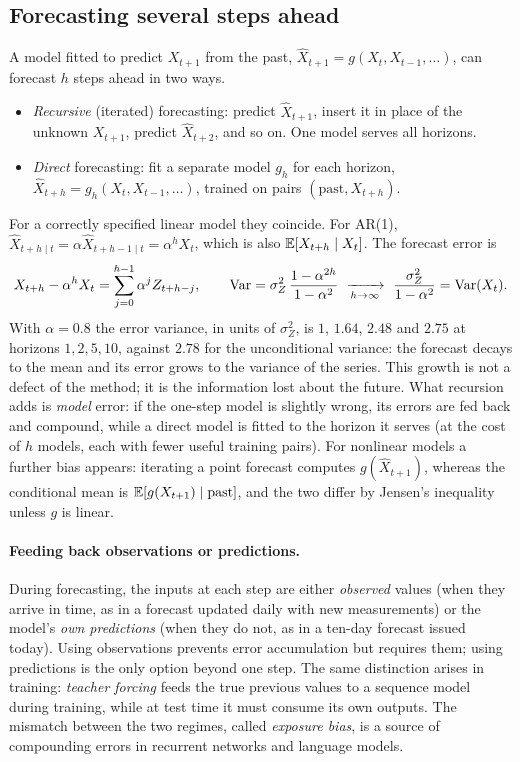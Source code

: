 \begin{notechapter}
\section{Forecasting several steps ahead}\label{decomposition-forecasting:sec:multistep}

A model fitted to predict $X_{t+1}$ from the past, $\hat X_{t+1} = g(X_t, X_{t-1},\dots)$, can forecast $h$ steps ahead
in two ways.
\begin{itemize}[nosep]
  \item \emph{Recursive} (iterated) forecasting: predict $\hat X_{t+1}$, insert it in place of the unknown
        $X_{t+1}$, predict $\hat X_{t+2}$, and so on. One model serves all horizons.
  \item \emph{Direct} forecasting: fit a separate model $g_h$ for each horizon, $\hat X_{t+h} = g_h(X_t, X_{t-1},\dots)$,
        trained on pairs $(\text{past}, X_{t+h})$.
\end{itemize}
For a correctly specified linear model they coincide. For AR(1),
$\hat X_{t+h\mid t} = \alpha\hat X_{t+h-1\mid t} = \alpha^hX_t$, which is also $\mathbb{E}[X_{t+h}\mid X_t]$. The forecast error is
\[
  X_{t+h} - \alpha^hX_t = \sum_{j=0}^{h-1}\alpha^jZ_{t+h-j},\qquad
  \Var = \sigma_Z^2\,\frac{1 - \alpha^{2h}}{1 - \alpha^2}\ \xrightarrow[h\to\infty]{}\ \frac{\sigma_Z^2}{1 - \alpha^2} = \Var(X_t).
\]
With $\alpha = 0.8$ the error variance, in units of $\sigma_Z^2$, is $1$, $1.64$, $2.48$ and $2.75$ at horizons $1, 2, 5, 10$,
against $2.78$ for the unconditional variance: the forecast decays to the mean and its
error grows to the variance of the series. This growth is not a defect of the method; it
is the information lost about the future. What recursion adds is \emph{model} error: if the
one-step model is slightly wrong, its errors are fed back and compound, while a direct
model is fitted to the horizon it serves (at the cost of $h$ models, each with fewer useful
training pairs). For nonlinear models a further bias appears: iterating a point forecast
computes $g(\hat X_{t+1})$, whereas the conditional mean is $\mathbb{E}[g(X_{t+1})\mid\text{past}]$, and the two differ by
Jensen's inequality unless $g$ is linear.

\paragraph{Feeding back observations or predictions.} During forecasting, the inputs at
each step are either \emph{observed} values (when they arrive in time, as in a forecast
updated daily with new measurements) or the model's \emph{own predictions} (when they do
not, as in a ten-day forecast issued today). Using observations prevents error
accumulation but requires them; using predictions is the only option beyond one step.
The same distinction arises in training: \emph{teacher forcing} feeds the true previous values
to a sequence model during training, while at test time it must consume its own outputs.
The mismatch between the two regimes, called \emph{exposure bias}, is a source of
compounding errors in recurrent networks and language models.


\end{notechapter}
